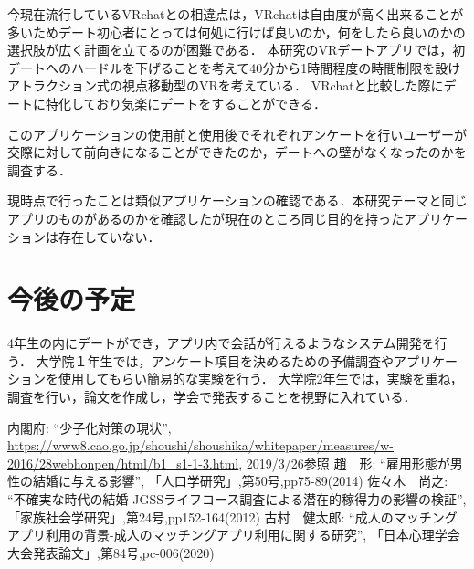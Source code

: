 \documentclass[12pt]{ltjsarticle}
\begin{document}

今現在流行しているVRchatとの相違点は，VRchatは自由度が高く出来ることが多いためデート初心者にとっては何処に行けば良いのか，何をしたら良いのかの選択肢が広く計画を立てるのが困難である．
本研究のVRデートアプリでは，初デートへのハードルを下げることを考えて40分から1時間程度の時間制限を設けアトラクション式の視点移動型のVRを考えている．
VRchatと比較した際にデートに特化しており気楽にデートをすることができる．

このアプリケーションの使用前と使用後でそれぞれアンケートを行いユーザーが交際に対して前向きになることができたのか，デートへの壁がなくなったのかを調査する．

現時点で行ったことは類似アプリケーションの確認である．本研究テーマと同じアプリのものがあるのかを確認したが現在のところ同じ目的を持ったアプリケーションは存在していない．




\section{今後の予定}
4年生の内にデートができ，アプリ内で会話が行えるようなシステム開発を行う．
大学院１年生では，アンケート項目を決めるための予備調査やアプリケーションを使用してもらい簡易的な実験を行う．
大学院2年生では，実験を重ね，調査を行い，論文を作成し，学会で発表することを視野に入れている．

\begin{thebibliography}{99}
 内閣府: ``少子化対策の現状'', \url{https://www8.cao.go.jp/shoushi/shoushika/whitepaper/measures/w-2016/28webhonpen/html/b1_s1-1-3.html}, 2019/3/26参照
 趙　形: ``雇用形態が男性の結婚に与える影響'', 「人口学研究」,第50号,pp75-89(2014)
 佐々木　尚之: ``不確実な時代の結婚-JGSSライフコース調査による潜在的稼得力の影響の検証'', 「家族社会学研究」,第24号,pp152-164(2012)
 古村　健太郎: ``成人のマッチングアプリ利用の背景-成人のマッチングアプリ利用に関する研究'', 「日本心理学会大会発表論文」,第84号,pc-006(2020)
\end{thebibliography}
\end{document}

